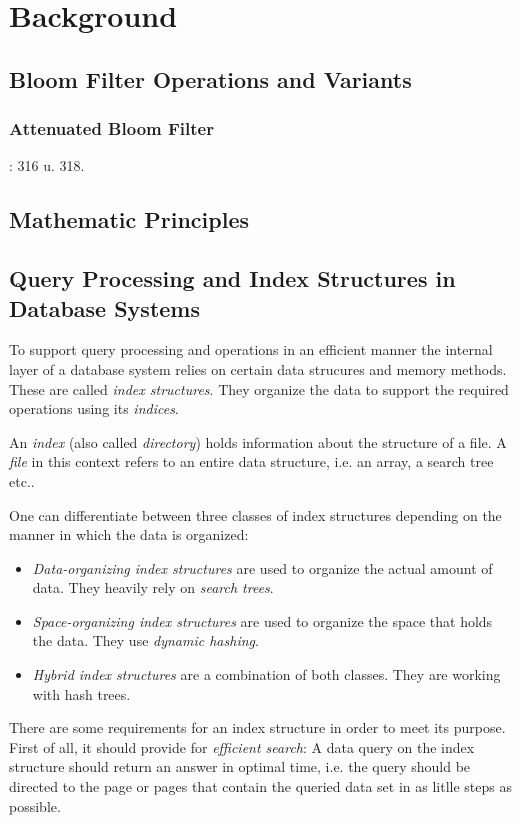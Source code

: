 \chapter{Background}\label{sec:Background}
\section{Bloom Filter Operations and Variants}
\subsection{Attenuated Bloom Filter}
\cite{Sakuma2011}: 316 u. 318.
\section{Mathematic Principles}
\section{Query Processing and Index Structures in Database Systems}
To support query processing and operations in an efficient manner the internal layer of a database system relies on certain data strucures and memory methods. These are called \textit{index structures}. They organize the data to support the required operations using its \textit{indices}.

An \textit{index} (also called \textit{directory}) holds information about the structure of a file. A \textit{file} in this context refers to an entire data structure, i.e. an array, a search tree etc.. 

One can differentiate between three classes of index structures depending on the manner in which the data is organized: 
\begin{itemize}
	\item \textit{Data-organizing index structures} are used to organize the actual amount of data. They heavily rely on \textit{search trees}. 
	\item \textit{Space-organizing index structures} are used to organize the space that holds the data. They use \textit{dynamic hashing}. 
	\item \textit{Hybrid index structures} are a combination of both classes. They are working with hash trees.   
\end{itemize}
There are some requirements for an index structure in order to meet its purpose. First of all, it should provide for \textit{efficient search}: A data query on the index structure should return an answer in optimal time, i.e. the query should be directed to the page or pages that contain the queried data set in as litlle steps as possible.

